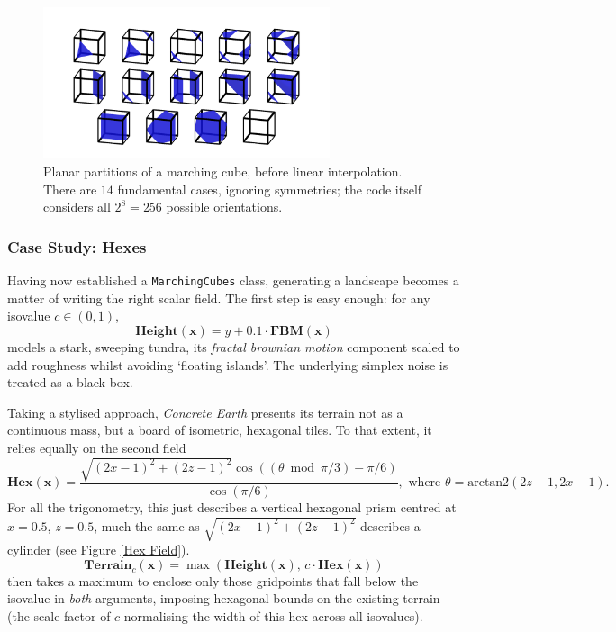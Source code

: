 \documentclass[a4paper, 11pt]{article}
\begin{document}
\begin{flushleft}
\vspace{5pt}\noindent
\begin{figure}[h]
\centering
\includegraphics[width=0.75\textwidth]{Marching Cube Partitions}
\caption{Planar partitions of a marching cube, before linear interpolation. There are $14$ fundamental cases, ignoring symmetries; the code itself considers all $2^8 = 256$ possible orientations.}
\label{Marching Cube Partitions}
\end{figure}

\newpage
\subsubsection{Case Study: Hexes}

Having now established a \texttt{MarchingCubes} class, generating a landscape becomes a matter of writing the right scalar field. The first step is easy enough: for any isovalue $c \in \left(0,1\right)$,
$$\textbf{Height}(\mathbf{x}) = y + 0.1\cdot\textbf{FBM}(\mathbf{x})$$
models a stark, sweeping tundra, its \textit{fractal brownian motion} component scaled to add roughness whilst avoiding `floating islands'. The underlying simplex noise is treated as a black box.

\vspace{5pt}\noindent
Taking a stylised approach, \textit{Concrete Earth} presents its terrain not as a continuous mass, but a board of isometric, hexagonal tiles. To that extent, it relies equally on the second field
$$\textbf{Hex}(\mathbf{x}) = \frac{\sqrt{(2x-1)^2+(2z-1)^2}\cos\left((\theta\bmod\pi/3)-\pi/6\right)}{\cos\left(\pi/6\right)}, \,\, \textrm{where} \,\, \theta = \textrm{arctan2}\left(2z-1, 2x-1\right).$$
For all the trigonometry, this just describes a vertical hexagonal prism centred at $x = 0.5$, $z = 0.5$, much the same as $\sqrt{(2x-1)^2+(2z-1)^2}$ describes a cylinder (see Figure \ref{Hex Field}).
$$\textbf{Terrain}_c(\mathbf{x}) = \max\left(\textbf{Height}(\mathbf{x}), \, c\cdot\textbf{Hex}(\mathbf{x})\right)$$
then takes a maximum to enclose only those gridpoints that fall below the isovalue in \textit{both} arguments, imposing hexagonal bounds on the existing terrain (the scale factor of $c$ normalising the width of this hex across all isovalues). 


\end{flushleft}
\end{document}
